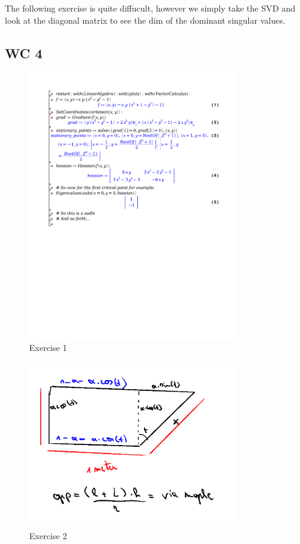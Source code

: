 \documentclass[a4paper]{report}
\begin{document}
The following exercise is quite diffucult, however we simply take the SVD and look at the diagonal matrix to see the dim of the dominant singular values.



\subsection*{WC 4}

\begin{figure}[H]
	\centering
	\includegraphics[width=0.8\textwidth]{exercises/wc_4_ex_1.pdf}
	\caption{Exercise 1}
	\label{fig:word_4_ex_1}
\end{figure}


\begin{figure}[H]
	\centering
	\includegraphics[width=0.8\textwidth]{assets/wc_4_ex_2.png}
	\caption{Exercise 2}
	\label{fig:wc_4_ex_2}
\end{figure}
\end{document}
